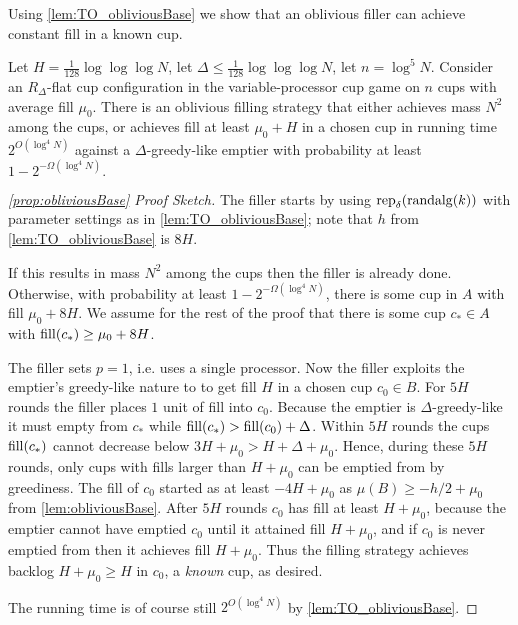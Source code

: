 Using \cref{lem:TO_obliviousBase} we show that an
oblivious filler can achieve constant fill in a known cup.
\begin{proposition}
  \label{prop:TO_obliviousBase}
  Let $H = \frac{1}{128}\log\log\log N$, let $\Delta \le
  \frac{1}{128}\log\log\log N$, let $n = \log^5 N$. 
  Consider an $R_\Delta$-flat cup configuration in the
  variable-processor cup game on $n$ cups with average fill $\mu_0$.
  There is an oblivious filling strategy that either
  achieves mass $N^2$ among the cups, or achieves fill at least $\mu_0 + H$
  in a chosen cup in running time $2^{O(\log^4 N)}$ against a
  $\Delta$-greedy-like emptier with probability at least
  $1-2^{-\Omega(\log^4 N)}.$
\end{proposition}
\begin{proof}[\cref{prop:obliviousBase} Proof Sketch]
  The filler starts by using $\operatorname{\text{\textup{rep}}}_\delta(\operatorname{\text{\textup{randalg}}}(k))$ with
  parameter settings as in \cref{lem:TO_obliviousBase};
  note that $h$ from \cref{lem:TO_obliviousBase} is $8H$.

  If this results in mass $N^2$ among the cups then the filler is
  already done. Otherwise, with probability at least
  $1-2^{-\Omega(\log^4 N)}$, there is some cup in $A$ with fill
  $\mu_0 + 8H$. We assume for the rest of the proof that there is
  some cup $c_* \in A$ with $\operatorname{\text{\textup{fill}}}(c_*) \ge \mu_0 + 8H$.

  The filler sets $p=1$, i.e. uses a single processor. Now the
  filler exploits the emptier's greedy-like nature to to get fill
  $H$ in a chosen cup $c_0 \in B$. For $5H$ rounds
  the filler places $1$ unit of fill into $c_0$. Because the
  emptier is $\Delta$-greedy-like it must empty from $c_*$ 
  while $\operatorname{\text{\textup{fill}}}(c_*) > \operatorname{\text{\textup{fill}}}(c_0) + \Delta$. Within $5H$ rounds
  the cups $\operatorname{\text{\textup{fill}}}(c_*)$ cannot decrease below $3H+\mu_0 > H + \Delta + \mu_0$.
  Hence, during these $5H$ rounds, only cups with fills larger
  than $H + \mu_0$ can be emptied from by greediness. 
  The fill of $c_0$ started as at least
  $-4H+\mu_0$ as $\mu(B) \ge -h/2+\mu_0$ from
  \cref{lem:obliviousBase}. After $5H$ rounds
  $c_0$ has fill at least $H+\mu_0$, because the emptier cannot
  have emptied $c_0$ until it attained fill $H+\mu_0$, and if
  $c_0$ is never emptied from then it achieves fill $H+\mu_0$.
  Thus the filling strategy achieves backlog $H+\mu_0 \ge H$
  in $c_0$, a \emph{known} cup, as desired.

  The running time is of course still $2^{O(\log^4 N)}$ by
  \cref{lem:TO_obliviousBase}.
\end{proof}

